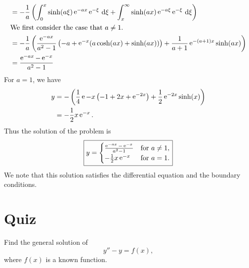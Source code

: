 {\begin{Solution}
\begin{enumerate}
\begin{align*}
      &= - \frac{1}{a} \left( 
        \int_0^x \sinh(a \xi) \mathop{\mathrm{e}}\nolimits^{-a x} \mathop{\mathrm{e}}\nolimits^{- \xi} \,\mathrm{d} \xi
        + \int_x^\infty \sinh(a x) \mathop{\mathrm{e}}\nolimits^{-a \xi} \mathop{\mathrm{e}}\nolimits^{-\xi} \,\mathrm{d} \xi 
      \right) \\
      \intertext{We first consider the case that $a \neq 1$.}
      &= - \frac{1}{a} \left( 
        \frac{ \mathop{\mathrm{e}}\nolimits^{-a x} }{a^2 - 1} \left( -a + \mathop{\mathrm{e}}\nolimits^{-x} 
          ( a \cosh(a x) + \sinh(a x) ) \right)
        + \frac{1}{a+1} \mathop{\mathrm{e}}\nolimits^{-(a+1) x} \sinh(a x)
      \right) \\
      &= \frac{ \mathop{\mathrm{e}}\nolimits^{-a x} - \mathop{\mathrm{e}}\nolimits^{-x} }{ a^2 - 1 }
    \end{align*}
    For $a = 1$, we have
    \begin{align*}
      y       &= - \left( \frac{1}{4} \mathop{\mathrm{e}}\nolimits{-x} \left( -1 + 2 x + \mathop{\mathrm{e}}\nolimits^{-2 x} \right)
        + \frac{1}{2} \mathop{\mathrm{e}}\nolimits^{-2 x} \sinh(x) \right) \\
      &= - \frac{1}{2} x \mathop{\mathrm{e}}\nolimits^{-x}.
    \end{align*}
    Thus the solution of the problem is
    \[
    \boxed{
      y = 
      \begin{cases}
        \frac{ \mathop{\mathrm{e}}\nolimits^{-a x} - \mathop{\mathrm{e}}\nolimits^{-x} }{ a^2 - 1 } &\mathrm{for}\ a \neq 1, \\
        - \frac{1}{2} x \mathop{\mathrm{e}}\nolimits^{-x} &\mathrm{for}\ a = 1.
      \end{cases}
      }
    \]
    We note that this solution satisfies the differential equation and 
    the boundary conditions.
  \end{enumerate}
\end{Solution}







}



\raggedbottom
\pagebreak
\flushbottom
\section{Quiz}


\begin{QuizProblem}
  \label{quiz problem y'' - y = f}
  Find the general solution of 
  \[
  y'' - y = f(x),
  \]
  where $f(x)$ is a known function.

\end{QuizProblem}










